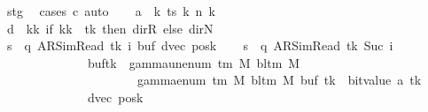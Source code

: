 \begin{isabellebody}
\ stg\ \isamarkupfalse%
\ {\isacharparenleft}{\kern0pt}cases\ c{\isacharprime}{\kern0pt}{\isacharparenright}{\kern0pt}\ auto\isanewline
\ \ \isamarkupfalse%
\ {\isacharquery}{\kern0pt}a\ {\isacharequal}{\kern0pt}\ {\isachardoublequoteopen}{\isasymlambda}k{\isachardot}{\kern0pt}\ ts\ k\ {\isacharparenleft}{\kern0pt}n\ k{\isacharparenright}{\kern0pt}{\isachardoublequoteclose}\isanewline
\ \ \isamarkupfalse%
\ {\isacharquery}{\kern0pt}d\ {\isacharequal}{\kern0pt}\ {\isachardoublequoteopen}{\isasymlambda}kk{\isachardot}{\kern0pt}\ if\ kk\ {\isacharequal}{\kern0pt}\ tk\ then\ dir{\isachardot}{\kern0pt}R\ else\ dir{\isachardot}{\kern0pt}N{\isachardoublequoteclose}\isanewline
\ \ \isamarkupfalse%
\ {\isacharquery}{\kern0pt}s\ {\isacharequal}{\kern0pt}\ {\isachardoublequoteopen}{\isacharparenleft}{\kern0pt}q{\isacharcomma}{\kern0pt}\ AR{\isacharunderscore}{\kern0pt}SimRead{\isacharcomma}{\kern0pt}\ tk{\isacharcomma}{\kern0pt}\ i{\isacharcomma}{\kern0pt}\ buf{\isacharcomma}{\kern0pt}\ dvec{\isacharcomma}{\kern0pt}\ posk{\isacharparenright}{\kern0pt}{\isachardoublequoteclose}\isanewline
\ \ \isamarkupfalse%
\ {\isacharquery}{\kern0pt}s{\isacharprime}{\kern0pt}\ {\isacharequal}{\kern0pt}\ {\isachardoublequoteopen}{\isacharparenleft}{\kern0pt}q{\isacharcomma}{\kern0pt}\ AR{\isacharunderscore}{\kern0pt}SimRead{\isacharcomma}{\kern0pt}\ tk{\isacharcomma}{\kern0pt}\ Suc\ i{\isacharcomma}{\kern0pt}\isanewline
\ \ \ \ \ \ \ \ \ \ \ \ \ \ buf{\isacharparenleft}{\kern0pt}tk\ {\isacharcolon}{\kern0pt}{\isacharequal}{\kern0pt}\ gamma{\isacharunderscore}{\kern0pt}unenum\ {\isacharparenleft}{\kern0pt}{\isasymGamma}{\isacharunderscore}{\kern0pt}tm\ M{\isacharparenright}{\kern0pt}\ {\isacharparenleft}{\kern0pt}bl{\isacharunderscore}{\kern0pt}tm\ M{\isacharparenright}{\kern0pt}\isanewline
\ \ \ \ \ \ \ \ \ \ \ \ \ \ \ \ \ \ \ \ {\isacharparenleft}{\kern0pt}{}\ {\isacharasterisk}{\kern0pt}\ gamma{\isacharunderscore}{\kern0pt}enum\ {\isacharparenleft}{\kern0pt}{\isasymGamma}{\isacharunderscore}{\kern0pt}tm\ M{\isacharparenright}{\kern0pt}\ {\isacharparenleft}{\kern0pt}bl{\isacharunderscore}{\kern0pt}tm\ M{\isacharparenright}{\kern0pt}\ {\isacharparenleft}{\kern0pt}buf\ tk{\isacharparenright}{\kern0pt}\ {\isacharplus}{\kern0pt}\ bit{\isacharunderscore}{\kern0pt}value\ {\isacharparenleft}{\kern0pt}{\isacharquery}{\kern0pt}a\ tk{\isacharparenright}{\kern0pt}{\isacharparenright}{\kern0pt}{\isacharparenright}{\kern0pt}{\isacharcomma}{\kern0pt}\isanewline
\ \ \ \ \ \ \ \ \ \ \ \ \ \ dvec{\isacharcomma}{\kern0pt}\ posk{\isacharparenright}{\kern0pt}{\isachardoublequoteclose}\isanewline

\end{isabellebody}
